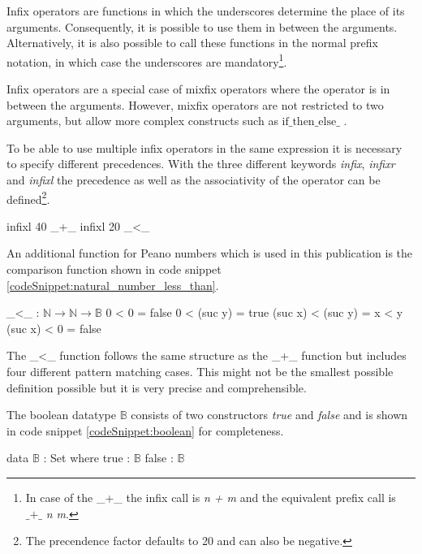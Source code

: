 Infix operators are functions in which the underscores determine the place of its arguments. Consequently, it is possible to use them in between the arguments.
Alternatively, it is also possible to call these functions in the normal prefix notation, in which case the underscores are mandatory\footnote{In case of the \_+\_ the infix call is \emph{n + m} and the equivalent prefix call is $\text{\_+\_}$ \emph{n m}.}.

Infix operators are a special case of mixfix operators where the operator is in between the arguments.
However, mixfix operators are not restricted to two arguments, but allow more complex constructs such as $\text{if\_then\_else\_}$ \cite{AgdaReadTheDocs}.

To be able to use multiple infix operators in the same expression it is necessary to specify different precedences.
With the three different keywords \emph{infix}, \emph{infixr} and \emph{infixl} the precedence as well as the associativity of the operator can be defined\footnote{The precendence factor defaults to 20 and can also be negative.}.

\begin{codesnippet}[mathescape=true, caption={Precedence and associativity of some Peano number operators}, label={codeSnippet:natural_number_precedence}]
infixl 40 _+_
infixl 20 _<_
\end{codesnippet}

An additional function for Peano numbers which is used in this publication is the comparison function shown in code snippet \ref{codeSnippet:natural_number_less_than}.

\begin{codesnippet}[mathescape=true, caption={Peano numbers less-than}, label={codeSnippet:natural_number_less_than}]
_<_ : $\mathbb{N} \rightarrow \mathbb{N} \rightarrow \mathbb{B}$
0 < 0 = false
0 < (suc y) = true
(suc x) < (suc y) = x < y
(suc x) < 0 = false
\end{codesnippet}

The \_\textless\_ function follows the same structure as the \_+\_ function but includes four different pattern matching cases. 
This might not be the smallest possible definition possible but it is very precise and comprehensible.

The boolean datatype $\mathbb{B}$ consists of two constructors \emph{true} and \emph{false} and is shown in code snippet \ref{codeSnippet:boolean} for completeness.

\begin{codesnippet}[mathescape=true, caption={Definition of the boolean datatype in Agda}, label={codeSnippet:boolean}]
data $\mathbb{B}$ : Set where
  true : $\mathbb{B}$
  false  : $\mathbb{B}$
\end{codesnippet}

